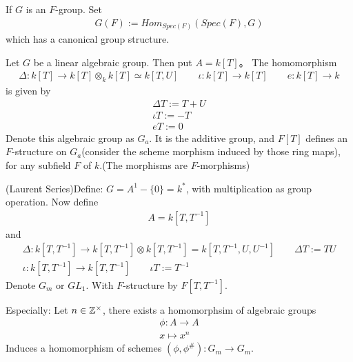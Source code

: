 \documentclass[Total.tex]{subfiles}
\begin{document}
			\begin{Def}
				If $G$ is an $F$-group. Set
				\begin{gather*}
					G(F):=Hom_{Spec(F)}(Spec(F),G)
				\end{gather*}
				which has a canonical group structure.
			\end{Def}
			\begin{example}
				Let $G$ be a linear algebraic group. Then put $A=k[T]$。 The homomorphism
				\begin{gather*}
					\Delta:k[T]\rightarrow k[T]\otimes_k k[T]\simeq k[T,U]\qquad \iota:k[T]\rightarrow k[T]\qquad e:k[T]\rightarrow k
				\end{gather*}
				is given by
				\begin{gather*}
					\Delta T:=T+U\\
					\iota T:=-T\\
					eT:=0
				\end{gather*}
				Denote this algebraic group as $G_a$. It is the additive group, and $F[T]$ defines an $F$-structure on $G_a$(consider the scheme morphism induced by those ring maps), for any subfield $F$ of $k$.(The morphisms are $F$-morphisms)
			\end{example}
			\begin{example}
				(Laurent Series)Define: $G=A^1-\{0\}=k^*$, with multiplication as group operation. Now define
				\begin{gather*}
					A=k[T,T^{-1}]
				\end{gather*}
				and
				\begin{gather*}
					\Delta:k[T,T^{-1}]\rightarrow k[T,T^{-1}]\otimes k[T,T^{-1}]=k[T,T^{-1},U,U^{-1}]\qquad \Delta T:=TU\\
					\iota:k[T,T^{-1}]\rightarrow k[T,T^{-1}]\qquad \iota T:=T^{-1}
				\end{gather*}
				Denote $G_m$ or $GL_1$. With $F$-structure by $F[T,T^{-1}]$.
				
				Especially: Let $n\in \mathbb{Z}^\times$, there exists a homomorphsim of algebraic groups
				\begin{gather*}
					\phi:A\rightarrow A\\
					x\mapsto x^n
				\end{gather*}
				Induces a homomorphism of schemes $(\phi,\phi^\#):G_m\rightarrow G_m$.
			\end{example}
\end{document}
